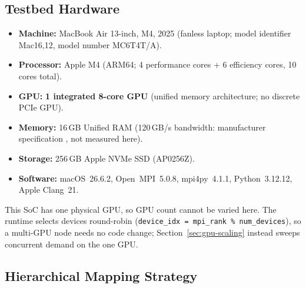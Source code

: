 \documentclass[a4paper,12pt]{report}
\begin{document}
\subsection{Testbed Hardware}

\begin{itemize}[noitemsep]
  \item \textbf{Machine:} MacBook Air 13-inch, M4, 2025 (fanless laptop;
    model identifier Mac16,12, model number MC6T4T/A).
  \item \textbf{Processor:} Apple M4 (ARM64; 4 performance
    cores + 6 efficiency cores, 10 cores total).
  \item \textbf{GPU:} \textbf{1 integrated 8-core GPU} (unified memory architecture; no discrete PCIe
    GPU).
  \item \textbf{Memory:} 16\,GB Unified RAM
    (120\,GB/s bandwidth: manufacturer specification \cite{applem4},
    not measured here).
  \item \textbf{Storage:} 256\,GB Apple NVMe SSD (AP0256Z).
  \item \textbf{Software:} macOS~26.6.2, Open~MPI~5.0.8,
    mpi4py~4.1.1, Python~3.12.12, Apple Clang~21.
\end{itemize}

This SoC has one physical GPU, so GPU count cannot be varied here. The runtime
selects devices round-robin
(\texttt{device\_\discretionary{}{}{}idx = mpi\_\discretionary{}{}{}rank \% num\_\discretionary{}{}{}devices}), so a
multi-GPU node needs no code change; Section~\ref{sec:gpu-scaling} instead
sweeps concurrent demand on the one GPU.

\subsection{Hierarchical Mapping Strategy}
\end{document}

